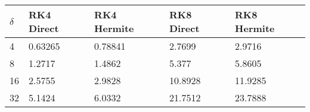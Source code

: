 \begin{tabular}{lllll}
$\delta$ & RK4 Direct & RK4 Hermite & RK8 Direct & RK8 Hermite \\  
\hline 
4 & 0.63265 & 0.78841 & 2.7699 & 2.9716 \\ 
8 & 1.2717 & 1.4862 & 5.377 & 5.8605 \\ 
16 & 2.5755 & 2.9828 & 10.8928 & 11.9285 \\ 
32 & 5.1424 & 6.0332 & 21.7512 & 23.7888 \\ 
\hline 
\end{tabular}